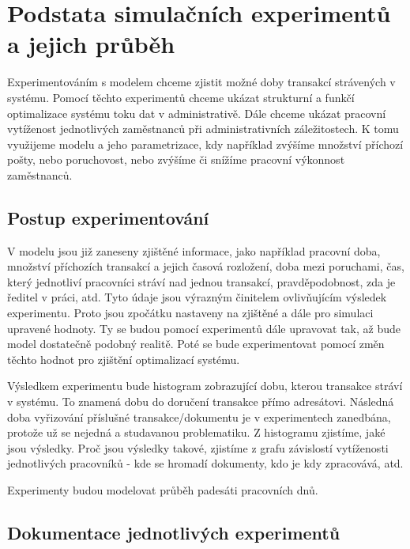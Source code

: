 \documentclass[12pt,a4paper]{article}
\begin{document}
\newpage


\section{Podstata simulačních experimentů a jejich průběh}

Experimentováním s modelem chceme zjistit možné doby transakcí strávených v sys\-té\-mu. Pomocí těchto experimentů chceme ukázat strukturní a funkčí optimalizace systému toku dat v administrativě. Dále chceme ukázat pracovní vytíženost jednotlivých za\-měst\-nan\-ců při administrativních záležitostech. K tomu využijeme modelu a jeho pa\-ra\-met\-ri\-za\-ce, kdy například zvýšíme množství příchozí pošty, nebo poruchovost, nebo zvýšíme či snížíme pracovní výkonnost zaměstnanců.

\subsection{Postup experimentování}
V modelu jsou již zaneseny zjištěné informace, jako například pracovní doba, množství příchozích transakcí a jejich časová rozložení, doba mezi poruchami, čas, který jednotliví pracovníci stráví nad jednou transakcí, pravděpodobnost, zda je ředitel v práci, atd. Tyto údaje jsou výrazným činitelem ovlivňujícím výsledek experimentu. Proto jsou zpočátku nastaveny na zjištěné a dále pro simulaci upravené hodnoty. Ty se budou pomocí experimentů dále upravovat tak, až bude model dostatečně podobný realitě. Poté se bude experimentovat pomocí změn těchto hodnot pro zjištění optimalizací systému.

Výsledkem experimentu bude histogram zobrazující dobu, kterou transakce stráví v systému. To znamená dobu do doručení transakce přímo adresátovi. Následná doba vyřizování příslušné transakce/dokumentu je v experimentech zanedbána, protože už se nejedná a studavanou problematiku. Z histogramu zjistíme, jaké jsou výsledky. Proč jsou výsledky takové, zjistíme z grafu závislostí vytíženosti jednotlivých pracovníků - kde se hromadí dokumenty, kdo je kdy zpracovává, atd. 

%
%
%
%

Experimenty budou modelovat průběh padesáti pracovních dnů.

\subsection{Dokumentace jednotlivých experimentů}
\end{document}
